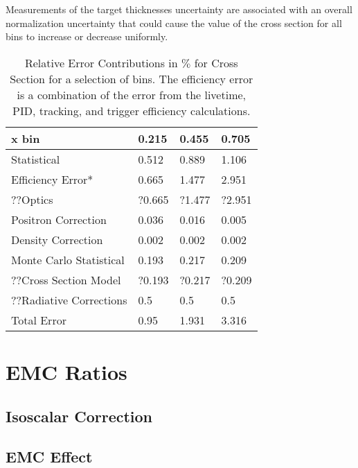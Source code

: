 Measurements of the target thicknesses uncertainty are associated with an overall normalization uncertainty that could cause the value of the cross section for all bins to increase or decrease uniformly.


\begin{table}[]
	\caption{Relative Error Contributions in $\%$ for Cross Section for a selection of bins. The efficiency error is a combination of the error from the livetime, PID, tracking, and trigger efficiency calculations.}
	\centering
	\begin{tabular}{|l|l|l|l|}
		\hline
		\textbf{\qquad \qquad\qquad x bin}   & \textbf{0.215} & \textbf{0.455} & \textbf{0.705} \\ \hline\hline
		Statistical             & 0.512 & 0.889 & 1.106 \\ \hline
		Efficiency Error*       & 0.665 & 1.477 & 2.951 \\ \hline
		??Optics 				& ?0.665& ?1.477 &?2.951 \\ \hline
		Positron Correction     & 0.036 & 0.016 & 0.005 \\ \hline
		Density Correction      & 0.002 & 0.002 & 0.002 \\ \hline
		Monte Carlo Statistical & 0.193 & 0.217 & 0.209 \\ \hline
		??Cross Section Model 	& ?0.193 & ?0.217 & ?0.209 \\ \hline
		??Radiative Corrections\cite{primer} 	& 0.5  & 0.5 & 0.5 \\ \hline
		Total Error		 	 	& 0.95  & 1.931 & 3.316 \\ \hline
	\end{tabular}
\end{table}
\cite{Ar_Ti}


\section{EMC Ratios}

\subsection{Isoscalar Correction}
\subsection{EMC Effect}

